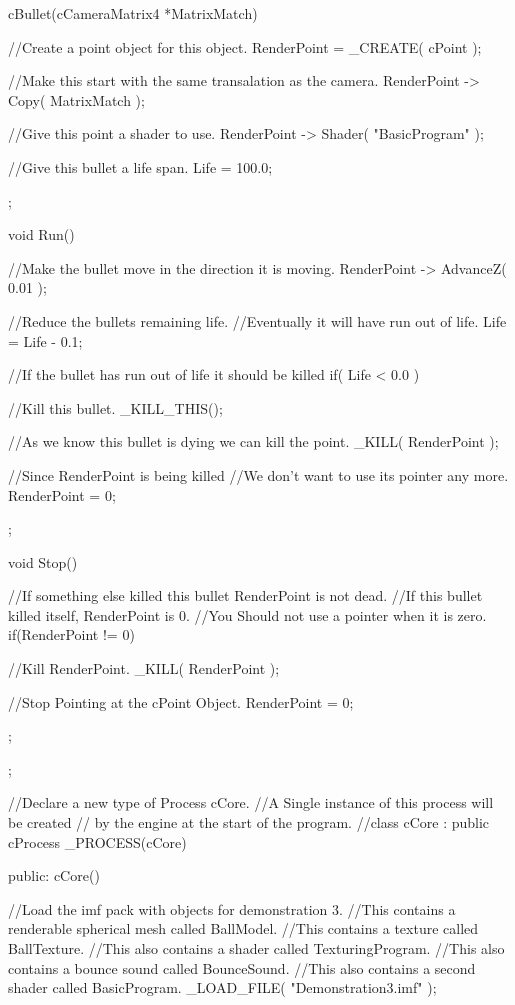 \begin{DoxyCode}
{   cBullet(cCameraMatrix4 *MatrixMatch)
   {
                //Create a point object for this object.
                RenderPoint = _CREATE( cPoint );

                //Make this start with the same transalation as the camera.
                RenderPoint -> Copy( MatrixMatch );

                //Give this point a shader to use.
                RenderPoint -> Shader( "BasicProgram" );

                //Give this bullet a life span.
                Life = 100.0;
   };

   void Run()
   {
                //Make the bullet move in the direction it is moving.
                RenderPoint -> AdvanceZ( 0.01 );

                //Reduce the bullets remaining life.
                //Eventually it will have run out of life.
                Life = Life - 0.1;

                //If the bullet has run out of life it should be killed
                if( Life < 0.0 )
                {
                        //Kill this bullet.
                        _KILL_THIS();

                        //As we know this bullet is dying we can kill the point.
                        _KILL( RenderPoint );

                        //Since RenderPoint is being killed
                        //We don't want to use its pointer any more.
                        RenderPoint = 0;
                }
   };

   void Stop()
   {
                //If something else killed this bullet RenderPoint is not dead.
                //If this bullet killed itself, RenderPoint is 0.
                //You Should not use a pointer when it is zero.
                if(RenderPoint != 0)
                {
                        //Kill RenderPoint.
                        _KILL( RenderPoint );

                        //Stop Pointing at the cPoint Object.
                        RenderPoint = 0;
                }
   };
};

 //Declare a new type of Process cCore.
//A Single instance of this process will be created
// by the engine at the start of the program.
//class cCore : public cProcess
 _PROCESS(cCore)
 {
  public:
        cCore()
        {
        //Load the imf pack with objects for demonstration 3.
        //This contains a renderable spherical mesh called BallModel.
        //This contains a texture called BallTexture.
        //This also contains a shader called TexturingProgram.
        //This also contains a bounce sound called BounceSound.
        //This also contains a second shader called BasicProgram.
                _LOAD_FILE( "Demonstration3.imf" );

}}
\end{DoxyCode}
